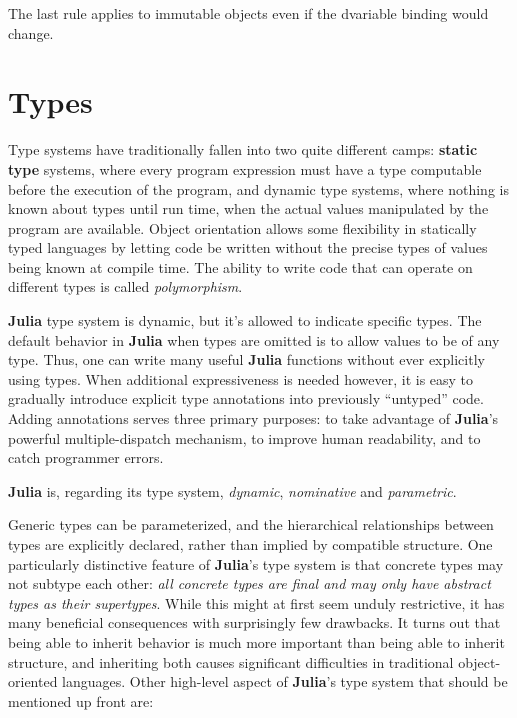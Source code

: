 \documentclass[
]{article}
\begin{document}
The last rule applies to immutable objects even if the dvariable binding
would change.

\newpage

\hypertarget{types}{%
\section{Types}\label{types}}

Type systems have traditionally fallen into two quite different camps:
\textbf{static type} systems, where every program expression must have a
type computable before the execution of the program, and dynamic type
systems, where nothing is known about types until run time, when the
actual values manipulated by the program are available. Object
orientation allows some flexibility in statically typed languages by
letting code be written without the precise types of values being known
at compile time. The ability to write code that can operate on different
types is called \emph{polymorphism}.

\textbf{Julia} type system is dynamic, but it's allowed to indicate
specific types. The default behavior in \textbf{Julia} when types are
omitted is to allow values to be of any type. Thus, one can write many
useful \textbf{Julia} functions without ever explicitly using types.
When additional expressiveness is needed however, it is easy to
gradually introduce explicit type annotations into previously
``untyped'' code. Adding annotations serves three primary purposes: to
take advantage of \textbf{Julia}'s powerful multiple-dispatch mechanism,
to improve human readability, and to catch programmer errors.

\textbf{Julia} is, regarding its type system, \emph{dynamic},
\emph{nominative} and \emph{parametric}.

Generic types can be parameterized, and the hierarchical relationships
between types are explicitly declared, rather than implied by compatible
structure. One particularly distinctive feature of \textbf{Julia}'s type
system is that concrete types may not subtype each other: \emph{all
concrete types are final and may only have abstract types as their
supertypes}. While this might at first seem unduly restrictive, it has
many beneficial consequences with surprisingly few drawbacks. It turns
out that being able to inherit behavior is much more important than
being able to inherit structure, and inheriting both causes significant
difficulties in traditional object-oriented languages. Other high-level
aspect of \textbf{Julia}'s type system that should be mentioned up front
are:
\end{document}
